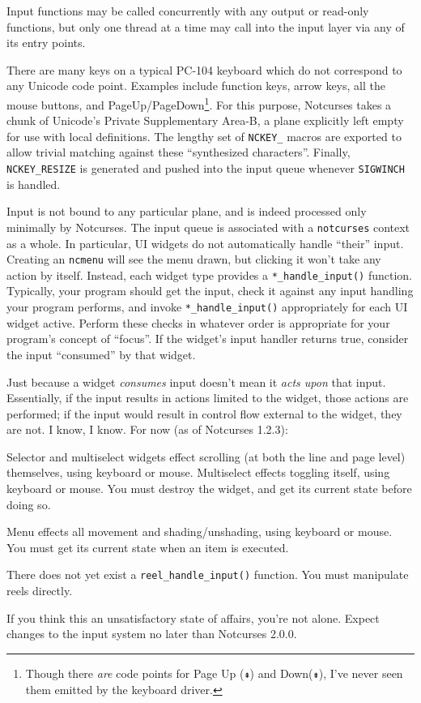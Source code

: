 Input functions may be called concurrently with any output or read-only
functions, but only one thread at a time may call into the input layer via any
of its entry points.

There are many keys on a typical PC-104 keyboard which do not correspond to any
Unicode code point. Examples include function keys, arrow keys, all the mouse
buttons, and PageUp/PageDown\footnote{Though there \textit{are} code points for
Page Up (\texttt{⇞}) and Down(\texttt{⇟}), I've never seen them emitted by the keyboard driver.}.
For this purpose, Notcurses takes a chunk of Unicode's Private Supplementary Area-B,
a plane explicitly left empty for use with local definitions. The lengthy set
of \texttt{NCKEY\_} macros are exported to allow trivial matching against
these ``synthesized characters''. Finally, \texttt{NCKEY\_RESIZE} is generated
and pushed into the input queue whenever \texttt{SIGWINCH} is handled.

Input is not bound to any particular plane, and is indeed processed only minimally
by Notcurses. The input queue is associated with a \texttt{notcurses} context
as a whole. In particular, UI widgets do not automatically handle ``their''
input. Creating an \texttt{ncmenu} will see the menu drawn, but clicking it
won't take any action by itself. Instead, each widget type provides a \texttt{*\_handle\_input()}
function. Typically, your program should get the input, check it against any
input handling your program performs, and invoke \texttt{*\_handle\_input()}
appropriately for each UI widget active. Perform these checks in whatever order
is appropriate for your program's concept of ``focus''. If the widget's input
handler returns true, consider the input ``consumed'' by that widget.

Just because a widget \textit{consumes} input doesn't mean it \textit{acts upon}
that input. Essentially, if the input results in actions limited to the widget,
those actions are performed; if the input would result in control flow external
to the widget, they are not. I know, I know. For now (as of Notcurses 1.2.3):
\begin{denseitemize}
\item{Selector and multiselect widgets effect scrolling (at both the line and
      page level) themselves, using keyboard or mouse. Multiselect effects toggling
      itself, using keyboard or mouse. You must destroy the widget, and get its
      current state before doing so.}
\item{Menu effects all movement and shading/unshading, using keyboard or mouse.
      You must get its current state when an item is executed.}
\item{There does not yet exist a \texttt{reel\_handle\_input()} function. You
      must manipulate reels directly.}
\end{denseitemize}
If you think this an unsatisfactory state of affairs, you're not alone. Expect
changes to the input system no later than Notcurses 2.0.0.
